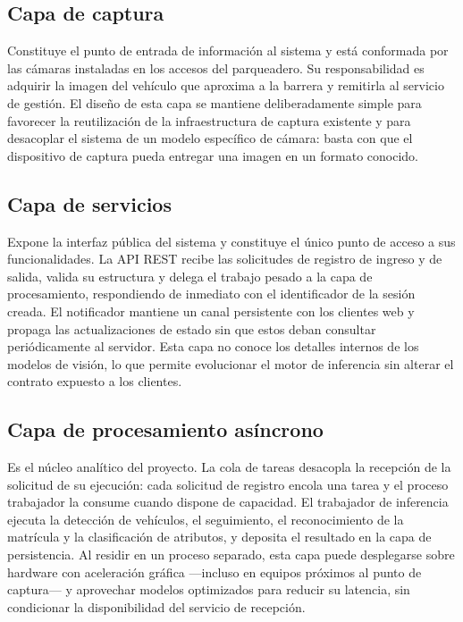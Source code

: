 \subsection{Capa de captura}

Constituye el punto de entrada de información al sistema y está conformada por
las cámaras instaladas en los accesos del parqueadero. Su responsabilidad es
adquirir la imagen del vehículo que aproxima a la barrera y remitirla al
servicio de gestión. El diseño de esta capa se mantiene deliberadamente simple
para favorecer la reutilización de la infraestructura de captura existente y
para desacoplar el sistema de un modelo específico de cámara: basta con que el
dispositivo de captura pueda entregar una imagen en un formato conocido.

\subsection{Capa de servicios}

Expone la interfaz pública del sistema y constituye el único punto de acceso a
sus funcionalidades. La API REST \cite{fielding2000architectural} recibe las solicitudes de registro de ingreso y
de salida, valida su estructura y delega el trabajo pesado a la capa de
procesamiento, respondiendo de inmediato con el identificador de la sesión
creada. El notificador mantiene un canal persistente con los clientes web y
propaga las actualizaciones de estado sin que estos deban consultar
periódicamente al servidor. Esta capa no conoce los detalles internos de los
modelos de visión, lo que permite evolucionar el motor de inferencia sin alterar
el contrato expuesto a los clientes.

\subsection{Capa de procesamiento asíncrono}

Es el núcleo analítico del proyecto. La cola de tareas desacopla la recepción de
la solicitud de su ejecución: cada solicitud de registro encola una tarea y el
proceso trabajador la consume cuando dispone de capacidad. El trabajador de
inferencia ejecuta la detección de vehículos, el seguimiento, el reconocimiento
de la matrícula y la clasificación de atributos, y deposita el resultado en la
capa de persistencia. Al residir en un proceso separado, esta capa puede
desplegarse sobre hardware con aceleración gráfica ---incluso en equipos
próximos al punto de captura--- y aprovechar modelos optimizados para reducir su
latencia, sin condicionar la disponibilidad del servicio de recepción.


